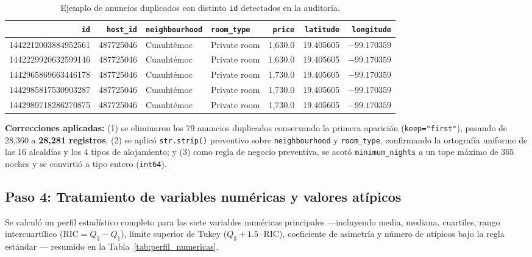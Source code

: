 \documentclass[12pt,letterpaper,oneside]{report}
\begin{document}
\begin{table}[htbp]
\centering
\caption{Ejemplo de anuncios duplicados con distinto \texttt{id} detectados en la auditoría.}
\label{tab:ejemplo_duplicados}
\scriptsize
\renewcommand{\arraystretch}{1.15}
\begin{tabular}{r r l l r r r}
\toprule
\rowcolor{TableHeader}
\textbf{\texttt{id}} & \textbf{\texttt{host\_id}} & \textbf{\texttt{neighbourhood}} & \textbf{\texttt{room\_type}} & \textbf{\texttt{price}} & \textbf{\texttt{latitude}} & \textbf{\texttt{longitude}} \\
\midrule
1442212003884952561 & 487725046 & Cuauhtémoc & Private room & 1,630.0 & 19.405605 & $-99.170359$ \\
1442229920632599146 & 487725046 & Cuauhtémoc & Private room & 1,630.0 & 19.405605 & $-99.170359$ \\
\rowcolor{RowStripe}
1442965869663446178 & 487725046 & Cuauhtémoc & Private room & 1,730.0 & 19.405605 & $-99.170359$ \\
\rowcolor{RowStripe}
1442985817530903287 & 487725046 & Cuauhtémoc & Private room & 1,730.0 & 19.405605 & $-99.170359$ \\
\rowcolor{RowStripe}
1442989718286270875 & 487725046 & Cuauhtémoc & Private room & 1,730.0 & 19.405605 & $-99.170359$ \\
\bottomrule
\end{tabular}
\end{table}

\textbf{Correcciones aplicadas:} (1) se eliminaron los 79 anuncios duplicados conservando la primera aparición (\texttt{keep="first"}), pasando de 28,360 a \textbf{28,281 registros}; (2) se aplicó \texttt{str.strip()} preventivo sobre \texttt{neighbourhood} y \texttt{room\_type}, confirmando la ortografía uniforme de las 16 alcaldías y los 4 tipos de alojamiento; y (3) como regla de negocio preventiva, se acotó \texttt{minimum\_nights} a un tope máximo de 365 noches y se convirtió a tipo entero (\texttt{int64}).

\subsection{Paso 4: Tratamiento de variables numéricas y valores atípicos}
\label{subsec:paso4}

Se calculó un perfil estadístico completo para las siete variables numéricas principales ---incluyendo media, mediana, cuartiles, rango intercuartílico ($\text{RIC} = Q_3 - Q_1$), límite superior de Tukey ($Q_3 + 1.5\cdot\text{RIC}$), coeficiente de asimetría y número de atípicos bajo la regla estándar \citep{tukey1977exploratory}--- resumido en la Tabla~\ref{tab:perfil_numericas}.
\end{document}
